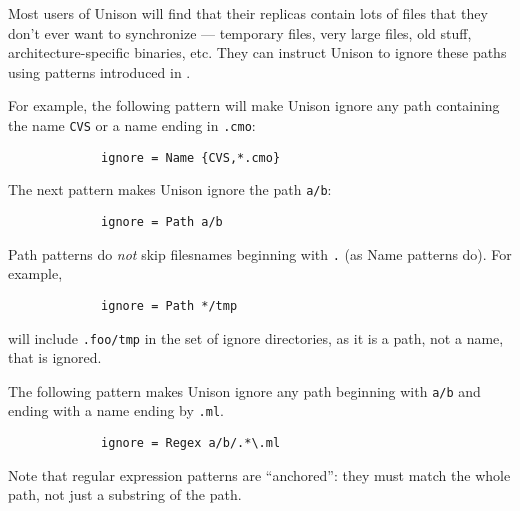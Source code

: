 \documentclass{article}
\begin{document}

Most users of Unison will find that their replicas contain lots of
files that they don't ever want to synchronize --- temporary files,
very large files, old stuff, architecture-specific binaries, etc.
They can instruct Unison to ignore these paths using patterns
introduced in .

For example, the following pattern will make Unison ignore any
path containing the name \verb|CVS| or a name ending in \verb|.cmo|:
\begin{verbatim}
             ignore = Name {CVS,*.cmo}
\end{verbatim}
The next pattern makes Unison ignore the path \verb|a/b|:
\begin{verbatim}
             ignore = Path a/b
\end{verbatim}
Path patterns do {\em not} skip filesnames beginning with \verb|.| (as Name
patterns do).  For example,
\begin{verbatim}
             ignore = Path */tmp
\end{verbatim}
will include \verb|.foo/tmp| in the set of ignore directories, as it is a
path, not a name, that is ignored.

The following pattern makes Unison ignore any path beginning with \verb|a/b|
and ending with a name ending by \verb|.ml|.
\begin{verbatim}
             ignore = Regex a/b/.*\.ml
\end{verbatim}
Note that regular expression patterns are ``anchored'': they must
match the whole path, not just a substring of the path.
\end{document}
